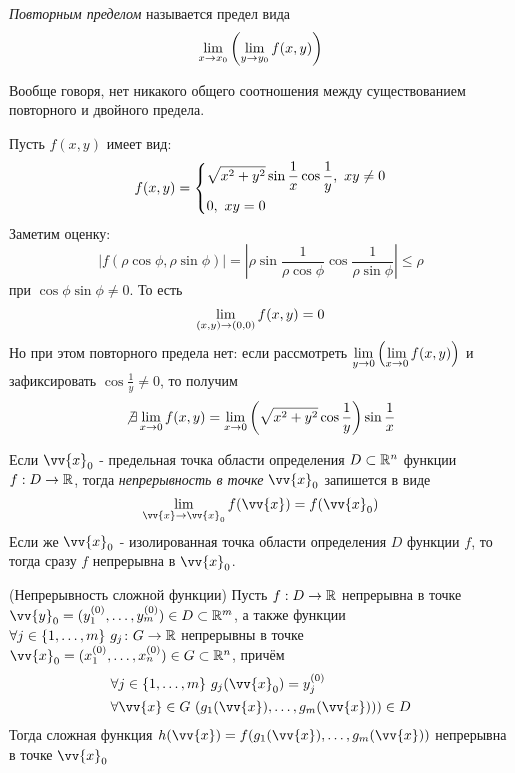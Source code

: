 \begin{definition}
	\textit{Повторным пределом} называется предел вида
	\[
		\lim\limits_{x \to x_0} \left(\lim\limits_{y \to y_0} f(x, y)\right)
	\]
\end{definition}

\begin{note}
	Вообще говоря, нет никакого общего соотношения между существованием повторного и двойного предела.
\end{note}

\begin{example}
	Пусть $f(x, y)$ имеет вид:
	\[
		f(x, y) = \System{
			&{\sqrt{x^2 + y^2} \sin \frac{1}{x} \cos \frac{1}{y}},\ xy \neq 0
			\\
			&{0,\ xy = 0}
		}
	\]
	Заметим оценку:
	\[
		|f(\rho\cos\phi, \rho\sin\phi)| =  \left|\rho\sin\frac{1}{\rho\cos\phi}\cos\frac{1}{\rho\sin\phi}\right| \le \rho
	\]
	при $\cos\phi\sin\phi \neq 0$. То есть
	\[
		\lim\limits_{(x, y) \to (0, 0)} f(x, y) = 0
	\]
	Но при этом повторного предела нет: если рассмотреть $\lim\limits_{y \to 0} \left(\lim\limits_{x \to 0} f(x, y)\right)$ и зафиксировать $\cos \frac{1}{y} \neq 0$, то получим
	\[
		\not\exists \lim\limits_{x \to 0} f(x, y) = \lim\limits_{x \to 0} \left(\sqrt{x^2 + y^2} \cos\frac{1}{y}\right)\sin\frac{1}{x}
	\]
\end{example}

\begin{definition}
	Если $\vv{x}_0$ - предельная точка области определения $D \subset \mathbb{R}^n$ функции $f: D \to \mathbb{R}$, тогда \textit{непрерывность в точке} $\vv{x}_0$ запишется в виде
	\[
		\liml_{\vv{x} \to \vv{x}_0} f(\vv{x}) = f(\vv{x}_0)
	\]
	Если же $\vv{x}_0$ - изолированная точка области определения $D$ функции $f$, то тогда сразу $f$ непрерывна в $\vv{x}_0$.
\end{definition}

\begin{theorem} (Непрерывность сложной функции)
	Пусть $f: D \to \mathbb{R}$ непрерывна в точке $\vv{y}_0 = (y_1^{(0)}, \ldots, y_m^{(0)}) \in D \subset \R^m$, а также функции $\forall j \in \{1, \ldots, m\}\ g_j \colon G \to \mathbb{R}$ непрерывны в точке $\vv{x}_0 = (x_1^{(0)}, \ldots, x_n^{(0)}) \in G \subset \R^n$, причём
	\begin{align*}
		&{\forall j \in \range{m}\ g_j(\vv{x}_0) = y_j^{(0)}}
		\\
		&{\forall \vv{x} \in G\ (g_1(\vv{x}), \ldots, g_m(\vv{x}))) \in D}
	\end{align*}
	Тогда сложная функция $h(\vv{x}) = f(g_1(\vv{x}), \ldots, g_m(\vv{x}))$ непрерывна в точке $\vv{x}_0$
\end{theorem}

